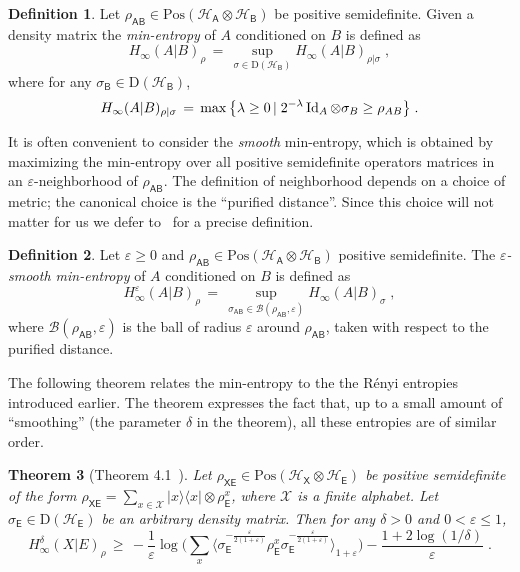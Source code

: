 \documentclass[11pt]{article}
\newtheorem{theorem}{Theorem}
\theoremstyle{remark}
\theoremstyle{definition}
\newtheorem{definition}[theorem]{Definition}
\newcommand{\ket}[1]{|#1\rangle}
\newcommand{\bra}[1]{\langle#1|}
\newcommand{\proj}[1]{\ket{#1}\!\bra{#1}}
\newcommand{\Id}{\ensuremath{\mathop{\rm Id}\nolimits}}
\newcommand{\reg}[1]{{\textsf{#1}}}
\newcommand{\mX}{\ensuremath{\mathcal{X}}}
\newcommand{\mH}{\mathcal{H}}
\newcommand{\setft}[1]{\mathrm{#1}}
\newcommand{\Density}{\setft{D}}
\newcommand{\Pos}{\setft{Pos}}
\newcommand{\eps}{\varepsilon}
\newcommand{\Hmin}{H_\infty}
\begin{document}
\begin{definition}\label{def:min-entropy}
Let $\rho_\reg{AB} \in \Pos(\mH_\reg{A}\otimes \mH_\reg{B})$ be positive semidefinite.  Given a density matrix  the \emph{min-entropy} of $A$ conditioned on $B$ is defined as
$$\Hmin(A|B)_\rho \,=\, \sup_{\sigma\in\Density(\mH_\reg{B})} \Hmin(A|B)_{\rho|\sigma}\;,$$
where for any $\sigma_\reg{B}\in \Density(\mH_\reg{B})$,
  \begin{equation*}
    \Hmin({A|B})_{\rho|\sigma} \,=\, \max \big\{\lambda \geq 0 \,|\; 2^{-\lambda} \Id_A \otimes \sigma_B \geq \rho_{AB}\big\}\;.
  \end{equation*}
\end{definition}

It is often convenient to consider the \emph{smooth} min-entropy, which is obtained by maximizing the min-entropy over all positive semidefinite operators matrices in an $\eps$-neighborhood of $\rho_\reg{AB}$. The definition of neighborhood depends on a choice of metric; the canonical choice is the ``purified distance''. Since this choice will not matter for us we defer to~\cite{tomamichel2015quantum} for a precise definition.

\begin{definition}\label{prelim:def:smooth-min-entropy}
  Let $\eps \geq 0$ and $\rho_\reg{AB}\in\Pos(\mH_\reg{A}\otimes\mH_\reg{B})$ positive semidefinite. The
  \emph{$\eps$-smooth min-entropy} of $A$ conditioned on $B$ is defined as
  \begin{equation*}
    \Hmin^\eps(A|B)_\rho \,=\, \sup_{\sigma_\reg{AB} \in \mathcal{B}(
      \rho_\reg{AB},\eps) } \Hmin(A|B)_\sigma\;,
  \end{equation*}
	where $\mathcal{B}(
      \rho_\reg{AB},\eps) $ is the ball of radius $\eps$ around $\rho_\reg{AB}$, taken with respect to the purified distance.
\end{definition}

The following theorem relates the min-entropy to the the R\'enyi entropies introduced earlier. The theorem expresses the fact that, up to a small amount of ``smoothing'' (the parameter $\delta$ in the theorem), all these entropies are of similar order. 

\begin{theorem}[Theorem 4.1~\cite{miller2014universal}]\label{thm:ms}
Let $ \rho_{\reg{XE}}\in\Pos(\mH_\reg{X}\otimes \mH_\reg{E}) $ be positive semidefinite of the form $\rho_{\reg{XE}} = \sum_{x\in\mX} \proj{x} \otimes \rho^x_{\reg{E}}$, where $\mX$ is a finite alphabet. Let $\sigma_{\reg{E}}\in\Density(\mH_\reg{E})$ be an arbitrary density matrix. Then for any $\delta >0$ and $0<\eps\leq 1$,
$$ \Hmin^\delta(X|E)_\rho \,\geq\, -\frac{1}{\eps} \log \Big( \sum_x \langle \sigma_{\reg{E}}^{-\frac{\eps}{2(1+\eps)}}\rho_{\reg{E}}^x \sigma_{\reg{E}}^{-\frac{\eps}{2(1+\eps)}} \rangle_{1+\eps} \Big) - \frac{1+2\log(1/\delta)}{\eps}\;.$$
\end{theorem}
\end{document}
